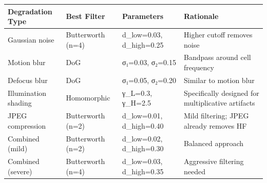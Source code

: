 \begin{tabular}{llll}
\toprule
Degradation Type & Best Filter & Parameters & Rationale \\
\midrule
Gaussian noise & Butterworth (n=4) & d_low=0.03, d_high=0.25 & Higher cutoff removes noise \\
Motion blur & DoG & σ₁=0.03, σ₂=0.15 & Bandpass around cell frequency \\
Defocus blur & DoG & σ₁=0.05, σ₂=0.20 & Similar to motion blur \\
Illumination shading & Homomorphic & γ_L=0.3, γ_H=2.5 & Specifically designed for multiplicative artifacts \\
JPEG compression & Butterworth (n=2) & d_low=0.01, d_high=0.40 & Mild filtering; JPEG already removes HF \\
Combined (mild) & Butterworth (n=2) & d_low=0.02, d_high=0.30 & Balanced approach \\
Combined (severe) & Butterworth (n=4) & d_low=0.03, d_high=0.35 & Aggressive filtering needed \\
\bottomrule
\end{tabular}
